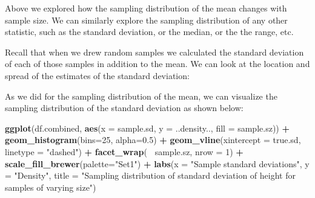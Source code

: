 \documentclass[]{book}
\newenvironment{Shaded}{\begin{snugshade}}{\end{snugshade}}
\newcommand{\CommentTok}[1]{\textcolor[rgb]{0.56,0.35,0.01}{\textit{#1}}}
\newcommand{\DataTypeTok}[1]{\textcolor[rgb]{0.13,0.29,0.53}{#1}}
\newcommand{\DecValTok}[1]{\textcolor[rgb]{0.00,0.00,0.81}{#1}}
\newcommand{\FloatTok}[1]{\textcolor[rgb]{0.00,0.00,0.81}{#1}}
\newcommand{\KeywordTok}[1]{\textcolor[rgb]{0.13,0.29,0.53}{\textbf{#1}}}
\newcommand{\NormalTok}[1]{#1}
\newcommand{\OperatorTok}[1]{\textcolor[rgb]{0.81,0.36,0.00}{\textbf{#1}}}
\newcommand{\StringTok}[1]{\textcolor[rgb]{0.31,0.60,0.02}{#1}}
\theoremstyle{definition}
\theoremstyle{definition}
\theoremstyle{definition}
\theoremstyle{remark}
\begin{document}
Above we explored how the sampling distribution of the mean changes with
sample size. We can similarly explore the sampling distribution of any
other statistic, such as the standard deviation, or the median, or the
the range, etc.

Recall that when we drew random samples we calculated the standard
deviation of each of those samples in addition to the mean. We can look
at the location and spread of the estimates of the standard deviation:

\begin{Shaded}
\end{Shaded}

As we did for the sampling distribution of the mean, we can visualize
the sampling distribution of the standard deviation as shown below:

\begin{Shaded}
\begin{Highlighting}[]
\KeywordTok{ggplot}\NormalTok{(df.combined, }\KeywordTok{aes}\NormalTok{(}\DataTypeTok{x =}\NormalTok{ sample.sd, }\DataTypeTok{y =}\NormalTok{ ..density.., }\DataTypeTok{fill =}\NormalTok{ sample.sz)) }\OperatorTok{+}\StringTok{ }
\StringTok{  }\KeywordTok{geom_histogram}\NormalTok{(}\DataTypeTok{bins=}\DecValTok{25}\NormalTok{, }\DataTypeTok{alpha=}\FloatTok{0.5}\NormalTok{) }\OperatorTok{+}\StringTok{ }
\StringTok{  }\KeywordTok{geom_vline}\NormalTok{(}\DataTypeTok{xintercept =}\NormalTok{ true.sd, }\DataTypeTok{linetype =} \StringTok{"dashed"}\NormalTok{)  }\OperatorTok{+}
\StringTok{  }\KeywordTok{facet_wrap}\NormalTok{(}\OperatorTok{~}\StringTok{ }\NormalTok{sample.sz, }\DataTypeTok{nrow =} \DecValTok{1}\NormalTok{) }\OperatorTok{+}\StringTok{ }
\StringTok{  }\KeywordTok{scale_fill_brewer}\NormalTok{(}\DataTypeTok{palette=}\StringTok{"Set1"}\NormalTok{) }\OperatorTok{+}
\StringTok{  }\KeywordTok{labs}\NormalTok{(}\DataTypeTok{x =} \StringTok{"Sample standard deviations"}\NormalTok{, }\DataTypeTok{y  =} \StringTok{"Density"}\NormalTok{,}
       \DataTypeTok{title =} \StringTok{"Sampling distribution of standard deviation of height for samples of varying size"}\NormalTok{)  }
\end{Highlighting}
\end{Shaded}
\end{document}
